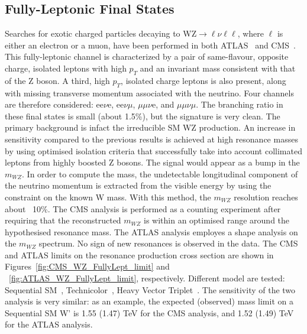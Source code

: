 \documentclass[3p,times,twocolumn]{elsarticle}
\begin{document}

\subsection{Fully-Leptonic Final States}
\label{sec:VVFullyLeptonic}

Searches for exotic charged particles decaying to WZ$\rightarrow
\ell\nu\ell\ell$, where $\ell$ is either an electron or a muon, 
have been performed in both ATLAS~\cite{Aad:2014pha} and CMS~\cite{Khachatryan:2014xja}. 
This fully-leptonic channel is characterized by a pair of
same-flavour, opposite charge, isolated leptons with high $p_{{T}}$
and an invariant mass consistent with that of the Z boson. A third, 
high $p_{{T}}$, isolated charge leptons is also present, along with
missing transverse momentum associated with the neutrino. 
Four channels are therefore considered: 
ee$\nu$e, ee$\nu\mu$, $\mu\mu\nu$e, and $\mu\mu\nu\mu$.
The branching ratio in these final states is small (about 1.5\%), but
the signature is very clean. The primary background is infact the 
irreducible SM WZ production.
An increase in sensitivity compared to the previous results 
is achieved at high resonance masses by using optimised isolation 
criteria that successfully take into account collimated leptons 
from highly boosted Z bosons. The signal would appear as a bump in the
$m_{WZ}$. In order to compute the mass, the undetectable longitudinal 
component of the neutrino momentum is extracted from the visible 
energy by using the constraint on the known W mass. 
With this method, the $m_{WZ}$ resolution reaches about ~10\%. 
The CMS analysis is performed as a counting
experiment after requiring that the reconstructed $m_{WZ}$ is within
an optimised range around the hypothesised resonance mass. The ATLAS
analysis employes a shape analysis on the $m_{WZ}$ spectrum. No sign
of new resonances is observed in the data. 
The CMS and ATLAS limits on the resonance production cross section 
are shown in Figures~\ref{fig:CMS_WZ_FullyLept_limit} 
and ~\ref{fig:ATLAS_WZ_FullyLept_limit},
respectively. Different model are tested: Sequential SM~\cite{Altarelli:1989ff}, 
Technicolor~\cite{Susskind:1978ms,Lane:1999uh,Eichten:2007sx}, Heavy Vector Triplet~\cite{Pappadopulo:2014qza}. 
The sensitivity of the two analysis is very similar: as an example, 
the expected (observed) mass limit on a Sequential SM W' is 
1.55 (1.47) TeV for the CMS analysis, and 1.52 (1.49) TeV for 
the ATLAS analysis.
 
\end{document}
